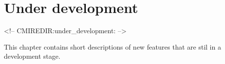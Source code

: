 
\chapter{Under development}
\label{chap:under_dvlp}

\begin{rawhtml}
<!-- CMIREDIR:under_development: -->
\end{rawhtml}

This chapter contains short descriptions of new features 
that are stil in a development stage.

%





%

